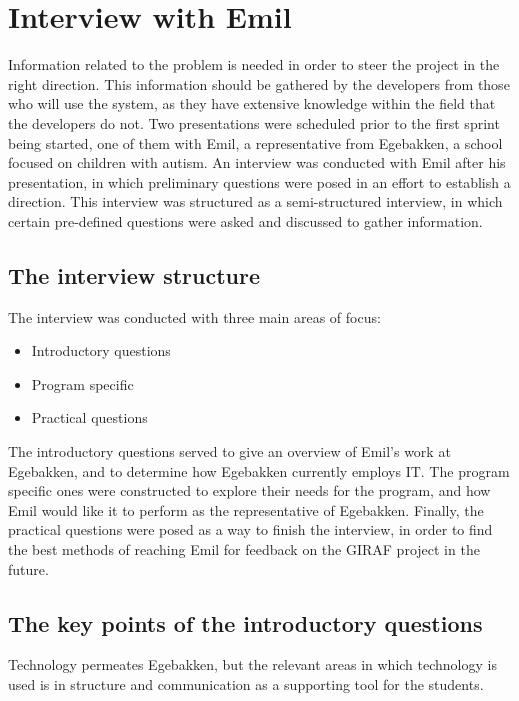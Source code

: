 \section{Interview with Emil}
Information related to the problem is needed in order to steer the project in the right direction.
This information should be gathered by the developers from those who will use the system, as they have extensive knowledge within the field that the developers do not.
Two presentations were scheduled prior to the first sprint being started, one of them with Emil, a representative from Egebakken, a school focused on children with autism.
An interview was conducted with Emil after his presentation, in which preliminary questions were posed in an effort to establish a direction.
This interview was structured as a semi-structured interview, in which certain pre-defined questions were asked and discussed to gather information.

\subsection{The interview structure}
The interview was conducted with three main areas of focus:
\begin{itemize}
    \item Introductory questions
    \item Program specific
    \item Practical questions 
\end{itemize}
\noindent
The introductory questions served to give an overview of Emil's work at Egebakken, and to determine how Egebakken currently employs IT.
The program specific ones were constructed to explore their needs for the program, and how Emil would like it to perform as the representative of Egebakken.
Finally, the practical questions were posed as a way to finish the interview, in order to find the best methods of reaching Emil for feedback on the GIRAF project in the future.

\subsection{The key points of the introductory questions}
Technology permeates Egebakken, but the relevant areas in which technology is used is in structure and communication as a supporting tool for the students.

